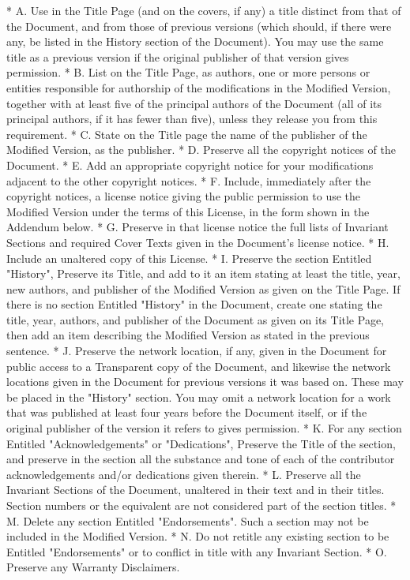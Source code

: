 \begin{multicols}{2}
{\footnotesize {*} A. Use in the Title Page (and on the covers, if any) a title distinct from that of the Document, and from those of previous versions (which should, if there were any, be listed in the History section of the Document). You may use the same title as a previous version if the original publisher of that version gives permission.  {*} B. List on the Title Page, as authors, one or more persons or entities responsible for authorship of the modifications in the Modified Version, together with at least five of the principal authors of the Document (all of its principal authors, if it has fewer than five), unless they release you from this requirement. {*} C. State on the Title page the name of the publisher of the Modified Version, as the publisher. {*} D. Preserve all the copyright notices of the Document.  {*} E. Add an
appropriate copyright notice for your modifications adjacent to the other copyright notices. {*} F. Include, immediately after the copyright notices, a license notice giving the public permission to use the Modified Version under the terms of this License, in the form shown in the Addendum below. {*} G. Preserve in that license notice the full lists of Invariant Sections and required Cover Texts given in the Document's license notice. {*} H. Include an unaltered copy of this License. {*} I. Preserve the section Entitled "History", Preserve its Title, and add to it an item stating at least the title, year, new authors, and publisher of the Modified Version as given on the Title Page. If there is no section Entitled "History" in the Document, create one stating the title, year,
authors, and publisher of the Document as given on its Title Page, then add an item describing the Modified Version as stated in the previous sentence.  {*} J. Preserve the network location, if any, given in the Document for public access to a Transparent copy of the Document, and likewise the network locations given in the Document for previous versions it was based on. These may be placed in the "History" section. You may omit a network location for a work that was published at least four years before the Document itself, or if the original publisher of the version it refers to gives permission. {*} K. For any section Entitled "Acknowledgements" or "Dedications", Preserve the Title of the section, and preserve in the section all the substance and
tone of each of the contributor acknowledgements and/or dedications given therein. {*} L. Preserve all the Invariant Sections of the Document, unaltered in their text and in their titles. Section numbers or the equivalent are not considered part of the section titles. {*} M. Delete any section Entitled "Endorsements". Such a section may not be included in the Modified Version. {*} N. Do not retitle any existing section to be Entitled "Endorsements" or to conflict in title with any Invariant Section. {*} O. Preserve any Warranty Disclaimers.}{\footnotesize \par}


\end{multicols}
